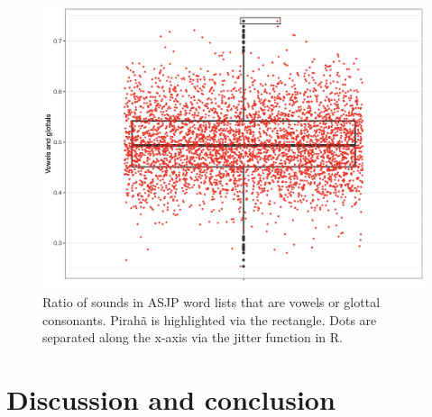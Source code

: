 \documentclass[output=paper,colorlinks,citecolor=brown
]{langscibook}
\begin{document}
\begin{figure}
\centering
\includegraphics[width=1\textwidth]{everett_figure6.png}
\caption{\label{fig:Figure 6}Ratio of sounds in ASJP word lists that are vowels or glottal consonants. Pirahã is highlighted via the rectangle. Dots are separated along the x-axis via the jitter function in R. 
}

\end{figure}

\section{Discussion and conclusion}
\end{document}
